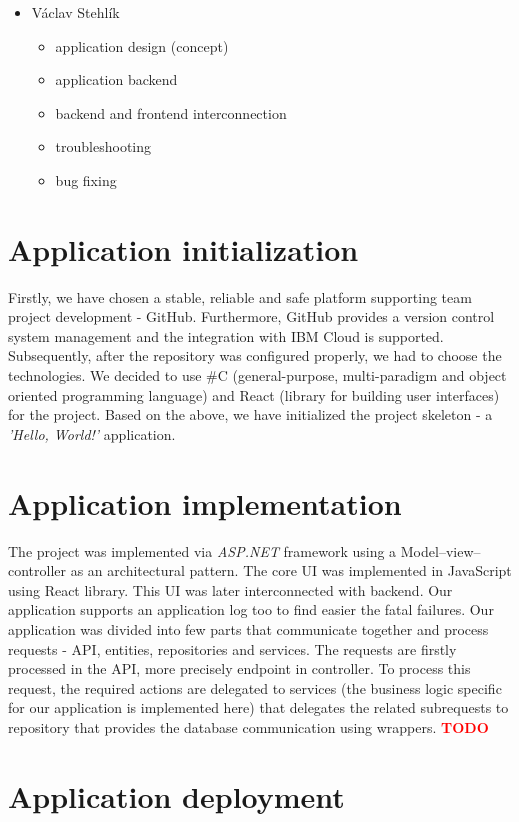 \documentclass[11pt,a4paper]{article}
\newcommand{\TODO}{\textbf{\textcolor{red}{TODO}}} %
\begin{document}
\begin{itemize}
    \item Václav Stehlík
    \begin{itemize}
        \item application design (concept)
        \item application backend
        \item backend and frontend interconnection
        \item troubleshooting
        \item bug fixing
    \end{itemize}
\end{itemize}

\section{Application initialization}

Firstly, we have chosen a stable, reliable and safe platform supporting team project development - GitHub. Furthermore, GitHub provides a version control system management and the integration with IBM Cloud is supported. Subsequently, after the repository was configured properly, we had to choose the technologies. We decided to use \#C (general-purpose, multi-paradigm and object oriented programming language) and React (library for building user interfaces) for the project. Based on the above, we have initialized the project skeleton - a \textit{'Hello, World!'} application.

\section{Application implementation}

The project was implemented via \textit{ASP.NET} framework using a Model--view--controller as an architectural pattern. The core UI was implemented in JavaScript using React library. This UI was later interconnected with backend. Our application supports an application log too to find easier the fatal failures. Our application was divided into few parts that communicate together and process requests - API, entities, repositories and services. The requests are firstly processed in the API, more precisely endpoint in controller. To process this request, the required actions are delegated to services (the business logic specific for our application is implemented here) that delegates the related subrequests to repository that provides the database communication using wrappers. \TODO

\section{Application deployment}
\end{document}
